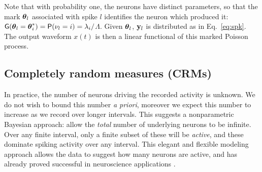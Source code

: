 Note that with probability one, the neurons have distinct parameters, so that the mark $\boldsymbol{\theta}_l$ associated with spike $l$ identifies the
neuron which produced it: $\mathsf{G}(\boldsymbol{\theta}_l = \boldsymbol{\theta}^*_i) = \mathsf{P}(\nu_l= i) = \lambda_i/$$\Lambda$. Given $\boldsymbol{\theta}_l$, $\mathbf{y}_l$ is distributed as in
Eq.~\eqref{eq:spk}. The output waveform $x(t)$ is then a linear functional of this marked Poisson process. %

\subsection{Completely random measures (CRMs)}  \label{sec:crm}

In practice, the number of neurons driving the recorded activity is unknown. We do not wish to bound this number \emph{a priori}, 
moreover we expect this number to increase as we 
record over longer intervals. This suggests a nonparametric Bayesian approach: allow the \emph{total} 
number of underlying neurons to be infinite.
Over any finite interval, only a finite subset of these will be \emph{active}, and these dominate spiking activity over any interval.
This elegant and flexible modeling approach allows the data to suggest how many neurons are active, and has already proved 
successful in neuroscience applications \citep{WoodBla2008}.
